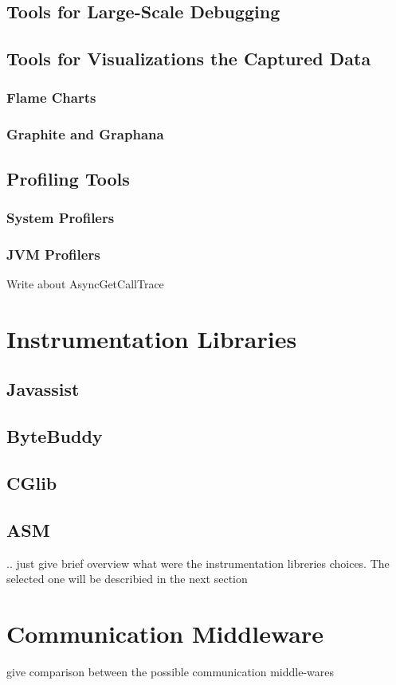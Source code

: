 \subsection{Tools for Large-Scale Debugging}
\subsection{Tools for Visualizations the Captured Data}
\subsubsection{Flame Charts}
\subsubsection{Graphite and Graphana}
\subsection{Profiling Tools}
\subsubsection{System Profilers}
\subsubsection{JVM Profilers}
Write about AsyncGetCallTrace



\section{Instrumentation Libraries}
\subsection{Javassist}
\subsection{ByteBuddy}
\subsection{CGlib}
\subsection{ASM}
.. just give brief overview what were the instrumentation libreries choices. The selected one will be describied in the next section

\section{Communication Middleware}
give comparison between the possible communication middle-wares
